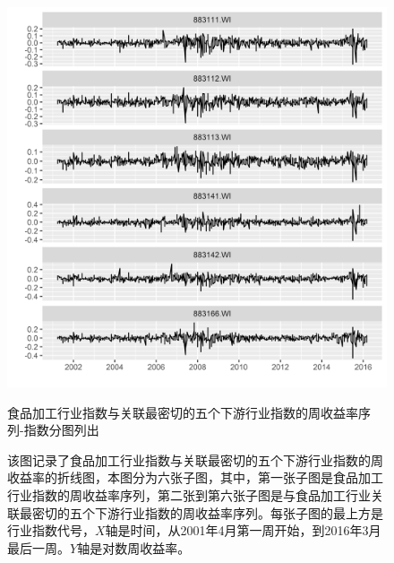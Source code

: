 \documentclass{sysuthesis}
\begin{document}
  \begin{figure}[htbp]
  \centering
  \includegraphics[scale=0.8]{image/883111-topk-lower-plus-one-weeklyyield-single.png}
  \caption{食品加工行业指数与关联最密切的五个下游行业指数的周收益率序列-指数分图列出}
  \caption*{\footnotesize 该图记录了食品加工行业指数与关联最密切的五个下游行业指数的周收益率的折线图，本图分为六张子图，其中，第一张子图是食品加工行业指数的周收益率序列，第二张到第六张子图是与食品加工行业关联最密切的五个下游行业指数的周收益率序列。每张子图的最上方是行业指数代号，$X$轴是时间，从2001年4月第一周开始，到2016年3月最后一周。$Y$轴是对数周收益率。}
  \label{fig:883111-topk-lower-plus-one-weeklyyield-single}
  \end{figure}
\end{document}
